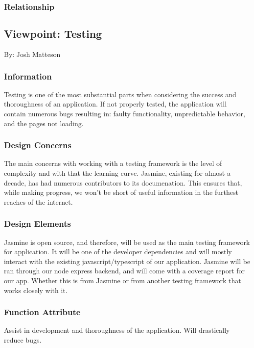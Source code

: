 \documentclass[letterpaper, 10pt, draftclsnofoot, compsoc, onecolumn]{IEEEtran}
\begin{document}
\subsubsection{Relationship}






\newpage
\subsection{Viewpoint: Testing}
{\noindent By: Josh Matteson \par}

\subsubsection{Information}
{\noindent Testing is one of the most substantial parts when considering the success and thoroughness of an application. 
If not properly tested, the application will contain numerous bugs resulting in: faulty functionality, unpredictable behavior, and the pages not loading. \par}

\subsubsection{Design Concerns}
{\noindent The main concerns with working with a testing framework is the level of complexity and with that the learning curve. 
Jasmine, existing for almost a decade, has had numerous contributors to its documenation. This ensures that, while making progress, 
we won't be short of useful information in the furthest reaches of the internet. \par}

\subsubsection{Design Elements}
{\noindent Jasmine is open source, and therefore, will be used as the main testing framework for application. 
It will be one of the developer dependencies and will mostly interact with the existing javascript/typescript of our application. 
Jasmine will be ran through our node express backend, and will come with a coverage report for our app. Whether this is from Jasmine or 
from another testing framework that works closely with it. \par}

\subsubsection{Function Attribute}
{\noindent Assist in development and thoroughness of the application. Will drastically reduce bugs. \par}
\end{document}
